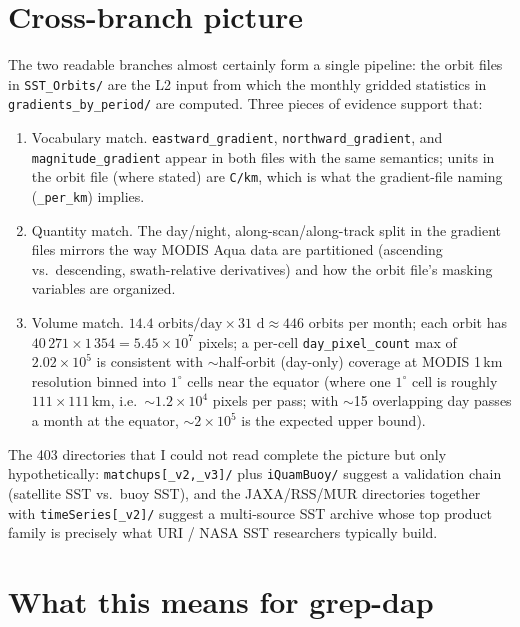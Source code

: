 \documentclass[11pt]{article}
\begin{document}
\section{Cross-branch picture}\label{sec:crossbranch}

The two readable branches almost certainly form a single pipeline:
the orbit files in \texttt{SST\_Orbits/} are the L2 input from which
the monthly gridded statistics in \texttt{gradients\_by\_period/}
are computed. Three pieces of evidence support that:

\begin{enumerate}
  \item Vocabulary match. \texttt{eastward\_gradient},
    \texttt{northward\_gradient}, and \texttt{magnitude\_gradient}
    appear in both files with the same semantics; units in the
    orbit file (where stated) are \texttt{C/km}, which is what
    the gradient-file naming (\texttt{\_per\_km}) implies.
  \item Quantity match. The day/night, along-scan/along-track
    split in the gradient files mirrors the way MODIS Aqua data
    are partitioned (ascending vs.\ descending, swath-relative
    derivatives) and how the orbit file's masking variables are
    organized.
  \item Volume match. $14.4 \text{ orbits/day} \times 31 \text{ d}
    \approx 446$ orbits per month; each orbit has
    $40\,271 \times 1\,354 = 5.45 \times 10^7$ pixels; a per-cell
    \texttt{day\_pixel\_count} max of $2.02 \times 10^5$ is
    consistent with $\sim$half-orbit (day-only) coverage at MODIS
    1\,km resolution binned into $1^\circ$ cells near the equator
    (where one $1^\circ$ cell is roughly $111 \times 111$\,km,
    i.e.\ $\sim 1.2 \times 10^4$ pixels per pass; with $\sim$15
    overlapping day passes a month at the equator, $\sim 2 \times
    10^5$ is the expected upper bound).
\end{enumerate}

The 403 directories that I could not read complete the picture but
only hypothetically: \texttt{matchups[\_v2,\_v3]/} plus
\texttt{iQuamBuoy/} suggest a validation chain (satellite SST vs.\
buoy SST), and the JAXA/RSS/MUR directories together with
\texttt{timeSeries[\_v2]/} suggest a multi-source SST archive whose
top product family is precisely what URI / NASA SST researchers
typically build.

\section{What this means for grep-dap}\label{sec:meaning}
\end{document}

